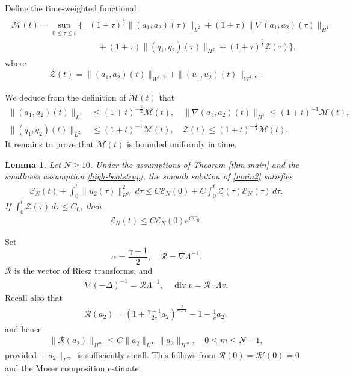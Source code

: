 \documentclass[10pt,reqno]{amsart}
\numberwithin{equation}{section}
\newtheorem{lem}[thm]{Lemma}
\begin{document}
Define the time-weighted functional
\begin{align}\label{M-new}
\begin{aligned}
\mathcal M(t)=\sup_{0\le\tau\le t}\Big\{& (1+\tau)^{\frac{1}{2}}\|(a_1,a_2)(\tau)\|_{L^2} +(1+\tau)\|\nabla(a_1,a_2)(\tau)\|_{H^1}\\
&\quad +(1+\tau)\|(q_1,q_2)(\tau)\|_{H^2} +(1+\tau)^{\frac{5}{4}}\mathcal Z(\tau)\Big\},
\end{aligned}
\end{align}
where
\begin{align}\label{Z-def}
\mathcal Z(t)=
\|(a_1,a_2)(t)\|_{W^{1,\infty}}
+\|(u_1,u_2)(t)\|_{W^{1,\infty}}.
\end{align}

We deduce from the definition of $\mathcal{M}(t)$ that
\begin{align*}
\|(a_1,a_2)(t)\|_{L^2}&\leq (1+t)^{-\frac{1}{2}}\mathcal{M}(t),\quad \|\nabla(a_1,a_2)(t)\|_{H^1} \leq (1+t)^{-1}\mathcal{M}(t),\\
\|(q_1,q_2)(t)\|_{L^2}&\leq (1+t)^{-1}\mathcal{M}(t),\quad \mathcal{Z}(t) \leq (1+t)^{-\frac{5}{4}}\mathcal{M}(t).
\end{align*}
It remains to prove that $\mathcal M(t)$ is bounded uniformly in time.

\begin{lem}\label{lem-high-order-energy}
Let {$N\geq 10$}. Under the assumptions of Theorem \ref{thm-main} and the
smallness assumption \eqref{high-bootstrap}, the smooth solution of
\eqref{main2} satisfies
\begin{align}\label{high-order-tame}
\mathcal E_N(t)+\int_0^t\|u_2(\tau)\|_{H^N}^2\,d\tau
\le C\mathcal E_N(0)
+C\int_0^t\mathcal Z(\tau)\mathcal E_N(\tau)\,d\tau .
\end{align}
If $\int_0^t\mathcal Z(\tau)\,d\tau\le C_0$, then
\begin{align}\label{high-order-bound}
\mathcal E_N(t)\le C\mathcal E_N(0)e^{CC_0}.
\end{align}
\end{lem}

\proof
Set
\[%
\alpha=\frac{\gamma-1}{2},\quad \mathscr R=\nabla\Lambda^{-1}.
\]%
$\mathscr R$ is the vector of Riesz transforms, and
\begin{align*}
\nabla(-\Delta)^{-1}=\mathscr R\Lambda^{-1},\quad
\operatorname{div}v=\mathscr R\cdot\Lambda v.
\end{align*}
Recall also that
\begin{align*}
\mathcal R(a_2)=\left(1+\frac{\gamma-1}{2c}a_2\right)^{\frac{2}{\gamma-1}}
-1-\frac1c a_2,
\end{align*}
and hence
\begin{align}\label{R-composition-high}
\|\mathcal R(a_2)\|_{H^m}
\le C\|a_2\|_{L^\infty}\|a_2\|_{H^m},
\quad 0\le m\le N-1,
\end{align}
provided $\|a_2\|_{L^\infty}$ is sufficiently small.  This follows from
$\mathcal R(0)=\mathcal R'(0)=0$ and the Moser composition estimate.
\end{document}
